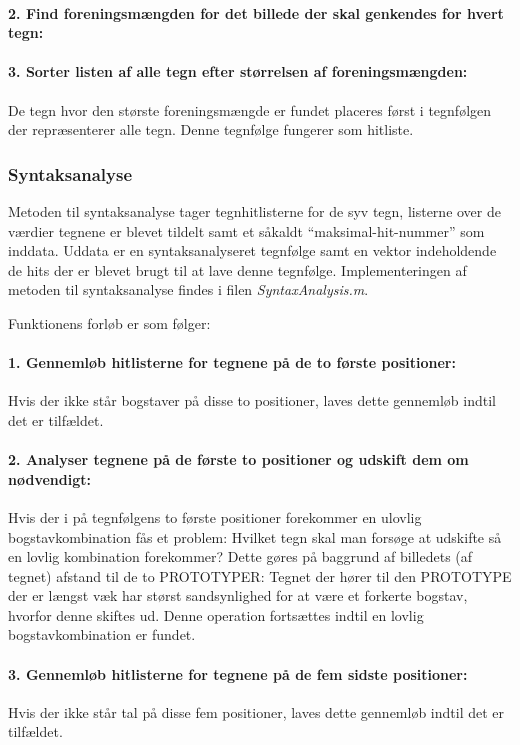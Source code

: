 \paragraph{2. Find foreningsmængden for det billede der skal genkendes for hvert tegn:}

\paragraph{3. Sorter listen af alle tegn efter størrelsen af foreningsmængden:} De tegn hvor den største foreningsmængde er fundet placeres først i tegnfølgen der repræsenterer alle tegn. Denne tegnfølge fungerer som hitliste.

\subsubsection{Syntaksanalyse}

Metoden til syntaksanalyse tager tegnhitlisterne for de syv tegn, listerne over de værdier tegnene er blevet tildelt samt et såkaldt ``maksimal-hit-nummer'' som inddata. Uddata er en syntaksanalyseret tegnfølge samt en vektor indeholdende de hits der er blevet brugt til at lave denne tegnfølge. Implementeringen af metoden til syntaksanalyse findes i filen \textit{SyntaxAnalysis.m}.

Funktionens forløb er som følger:

\paragraph{1. Gennemløb hitlisterne for tegnene på de to første positioner:} Hvis der ikke står bogstaver på disse to positioner, laves dette gennemløb indtil det er tilfældet.
\paragraph{2. Analyser tegnene på de første to positioner og udskift dem om nødvendigt:}
Hvis der i på tegnfølgens to første positioner forekommer en ulovlig bogstavkombination fås et problem: Hvilket tegn skal man forsøge at udskifte så en lovlig kombination forekommer? Dette gøres på baggrund af billedets (af tegnet) afstand til de to PROTOTYPER: Tegnet der hører til den PROTOTYPE der er længst væk har størst sandsynlighed for at være et forkerte bogstav, hvorfor denne skiftes ud. Denne operation fortsættes indtil en lovlig bogstavkombination er fundet.

\paragraph{3. Gennemløb hitlisterne for tegnene på de fem sidste positioner:} Hvis der ikke står tal på disse fem positioner, laves dette gennemløb indtil det er tilfældet.

